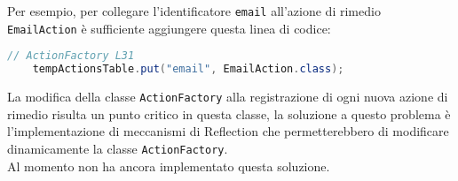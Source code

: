 		Per esempio, per collegare l'identificatore \lstinline{email} all'azione di rimedio \lstinline{EmailAction} è
		sufficiente aggiungere questa linea di codice:
		\begin{lstlisting}[language=Java]
	// ActionFactory L31
	tempActionsTable.put("email", EmailAction.class);
		\end{lstlisting}
		
		La modifica della classe \verb=ActionFactory= alla registrazione di ogni nuova azione di rimedio risulta un punto critico in 
		questa classe, la soluzione a questo problema è l'implementazione di meccanismi di Reflection che permetterebbero
		di modificare dinamicamente la classe \verb=ActionFactory=.\\
		Al momento \GroupName{} non ha ancora implementato questa soluzione.